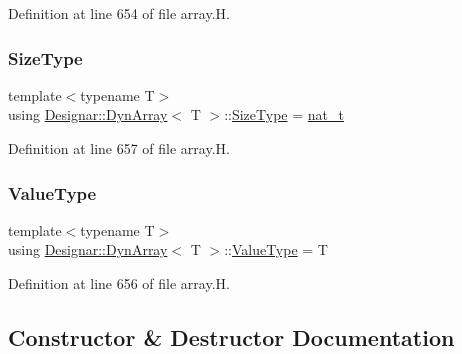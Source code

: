 Definition at line 654 of file array.\+H.

\mbox{\label{class_designar_1_1_dyn_array_a830e5247348d7d54c65d25f77ecc74bb}} 
\subsubsection{\texorpdfstring{Size\+Type}{SizeType}}
{\footnotesize\ttfamily template$<$typename T$>$ \\
using \hyperlink{class_designar_1_1_dyn_array}{Designar\+::\+Dyn\+Array}$<$ T $>$\+::\hyperlink{class_designar_1_1_fixed_array_a503ae414cc313d248e77c08e62ef043c}{Size\+Type} =  \hyperlink{namespace_designar_aa72662848b9f4815e7bf31a7cf3e33d1}{nat\+\_\+t}}



Definition at line 657 of file array.\+H.

\mbox{\label{class_designar_1_1_dyn_array_a1df36ad5f778935dcd565138afc155a4}} 
\subsubsection{\texorpdfstring{Value\+Type}{ValueType}}
{\footnotesize\ttfamily template$<$typename T$>$ \\
using \hyperlink{class_designar_1_1_dyn_array}{Designar\+::\+Dyn\+Array}$<$ T $>$\+::\hyperlink{class_designar_1_1_fixed_array_ac1cfeb4403a2dcbffd7ef494e5b873d0}{Value\+Type} =  T}



Definition at line 656 of file array.\+H.



\subsection{Constructor \& Destructor Documentation}
\mbox{\label{class_designar_1_1_dyn_array_a9a00e1336657f98b96e7c38fc7da332c}} 
